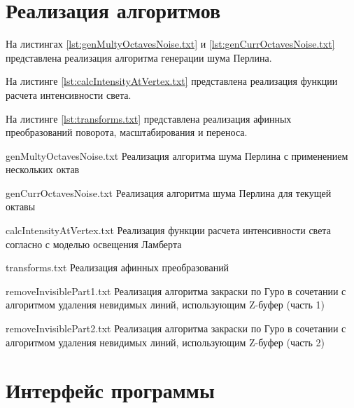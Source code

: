 \section{Реализация алгоритмов}

На листингах \ref{lst:genMultyOctavesNoise.txt} и \ref{lst:genCurrOctavesNoise.txt} представлена реализация алгоритма генерации шума Перлина.

На листинге \ref{lst:calcIntensityAtVertex.txt} представлена реализация функции расчета интенсивности света.

На листинге \ref{lst:transforms.txt} представлена реализация афинных преобразований поворота, масштабирования и переноса.

{genMultyOctavesNoise.txt} %
{Реализация алгоритма шума Перлина с применением нескольких октав} %

\clearpage

{genCurrOctavesNoise.txt} %
{Реализация алгоритма шума Перлина для текущей октавы} %

{calcIntensityAtVertex.txt} %
{Реализация функции расчета интенсивности света согласно с моделью освещения Ламберта} %

\clearpage

{transforms.txt} %
{Реализация афинных преобразований} %

\clearpage

{removeInvisiblePart1.txt} %
{Реализация алгоритма закраски по Гуро в сочетании с алгоритмом удаления невидимых линий, использующим Z-буфер (часть 1)} %

{removeInvisiblePart2.txt} %
{Реализация алгоритма закраски по Гуро в сочетании с алгоритмом удаления невидимых линий, использующим Z-буфер (часть 2)} %

\section{Интерфейс программы}


